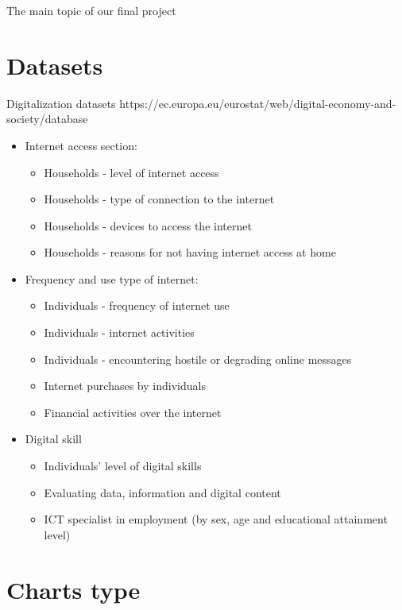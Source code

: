 \documentclass[12pt]{article}
\begin{document}
The main topic of our final project
\section{Datasets}
Digitalization datasets https://ec.europa.eu/eurostat/web/digital-economy-and-society/database
\begin{itemize}
    \item Internet access section:
          \begin{itemize}
              \item Households - level of internet access
              \item Households - type of connection to the internet
              \item Households - devices to access the internet
              \item Households - reasons for not having internet access at home
          \end{itemize}

    \item Frequency and use type of internet:
          \begin{itemize}
              \item Individuals - frequency of internet use
              \item Individuals - internet activities
              \item Individuals - encountering hostile or degrading online messages
              \item Internet purchases by individuals
              \item Financial activities over the internet
          \end{itemize}
    \item Digital skill
          \begin{itemize}
              \item Individuals' level of digital skills
              \item Evaluating data, information and digital content
              \item ICT specialist in employment (by sex, age and educational attainment level)
          \end{itemize}
\end{itemize}
\section{Charts type}
\end{document}
